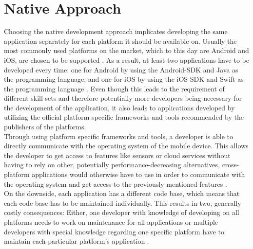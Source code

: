 \documentclass[Bachelor,BIF,english]{twbook}
\begin{document}
\section{Native Approach}
Choosing the native development approach implicates developing the same application separately for each platform it should be available on. Usually the most commonly used platforms on the market, which to this day are Android and iOS, are chosen to be supported \cite[p.~5]{Steczko2016}. As a result, at least two applications have to be developed every time: one for Android by using the Android-SDK and Java as the programming language, and one for iOS by using the iOS-SDK and Swift as the programming language \cite[p.~5]{LinckArne2016} \cite{AppleGettingStarted}. Even though this leads to the requirement of different skill sets and therefore potentially more developers being necessary for the development of the application, it also leads to applications developed by utilizing the official platform specific frameworks and tools recommended by the publishers of the platforms. 
\\[\baselineskip]
Through using platform specific frameworks and tools, a developer is able to directly communicate with the operating system of the mobile device. This allows the developer to get access to features like sensors or cloud services without having to rely on other, potentially performance-decreasing alternatives, cross-platform applications would otherwise have to use in order to communicate with the operating system and get access to the previously mentioned features \cite[p.~6]{LinckArne2016}.
\\[\baselineskip]
On the downside, each application has a different code base, which means that each code base has to be maintained individually. This results in two, generally costly consequences: Either, one developer with knowledge of developing on all platforms needs to work on maintenance for all applications or multiple developers with special knowledge regarding one specific platform have to maintain each particular platform’s application \cite[p.~6]{LinckArne2016}.
\end{document}
